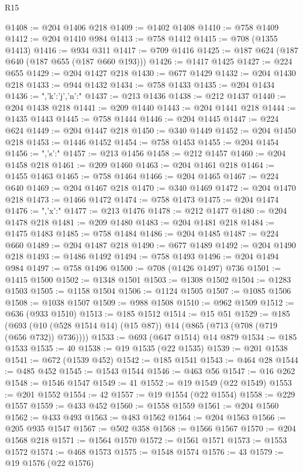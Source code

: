 \begin{lexlean}{R15}
\begin{coremodule}
{{{{{{@1408 := @204 @1406 @218
@1409 := @1402 @1408
@1410 := @758 @1409
@1412 := @204 @1410 @984
@1413 := @758 @1412
@1415 := @708 (@1355 @1413)
@1416 := @934 @311
@1417 := @709 @1416
@1425 := @187 @624 (@187 @640 (@187 @655 (@187 @660 @193)))
@1426 := @1417 @1425
@1427 := @224 @655
@1429 := @204 @1427 @218
@1430 := @677 @1429
@1432 := @204 @1430 @218
@1433 := @944 @1432
@1434 := @758 @1433
@1435 := @204 @1434
@1436 := ",'k':'j','n':"
@1437 := @213 @1436
@1438 := @212 @1437
@1440 := @204 @1438 @218
@1441 := @209 @1440
@1443 := @204 @1441 @218
@1444 := @1435 @1443
@1445 := @758 @1444
@1446 := @204 @1445
@1447 := @224 @624
@1449 := @204 @1447 @218
@1450 := @340 @1449
@1452 := @204 @1450 @218
@1453 := @1446 @1452
@1454 := @758 @1453
@1455 := @204 @1454
@1456 := ",'s':"
@1457 := @213 @1456
@1458 := @212 @1457
@1460 := @204 @1458 @218
@1461 := @209 @1460
@1463 := @204 @1461 @218
@1464 := @1455 @1463
@1465 := @758 @1464
@1466 := @204 @1465
@1467 := @224 @640
@1469 := @204 @1467 @218
@1470 := @340 @1469
@1472 := @204 @1470 @218
@1473 := @1466 @1472
@1474 := @758 @1473
@1475 := @204 @1474
@1476 := ",'x':"
@1477 := @213 @1476
@1478 := @212 @1477
@1480 := @204 @1478 @218
@1481 := @209 @1480
@1483 := @204 @1481 @218
@1484 := @1475 @1483
@1485 := @758 @1484
@1486 := @204 @1485
@1487 := @224 @660
@1489 := @204 @1487 @218
@1490 := @677 @1489
@1492 := @204 @1490 @218
@1493 := @1486 @1492
@1494 := @758 @1493
@1496 := @204 @1494 @984
@1497 := @758 @1496
@1500 := @708 (@1426 @1497) @736
@1501 := @1415 @1500
@1502 := @1348 @1501
@1503 := @1308 @1502
@1504 := @1283 @1503
@1505 := @1158 @1504
@1506 := @1124 @1505
@1507 := @1085 @1506
@1508 := @1038 @1507
@1509 := @988 @1508
@1510 := @962 @1509
@1512 := @636 (@933 @1510)
@1513 := @185 @1512
@1514 := @15 @51
@1529 := @185
    (@693 (@10 (@528 @1514 @14) (@15 @87)) @14 (@865 (@713 (@708 (@719 (@656 @732)) @736))))
@1533 := @693 (@647 @1514) @14 @879
@1534 := @185 @1533
@1535 := 40
@1538 := @19 @1535 (@22 @1535)
@1539 := @201 @1538
@1541 := @672 (@1539 @452)
@1542 := @185 @1541
@1543 := @464 @28
@1544 := @485 @452
@1545 := @1543 @1544
@1546 := @463 @56
@1547 := @16 @262
@1548 := @1546 @1547
@1549 := 41
@1552 := @19 @1549 (@22 @1549)
@1553 := @201 @1552
@1554 := 42
@1557 := @19 @1554 (@22 @1554)
@1558 := @229 @1557
@1559 := @433 @452
@1560 := @1558 @1559
@1561 := @204 @1560
@1562 := @433 @493
@1563 := @483 @1562
@1564 := @204 @1563
@1566 := @205 @935 @1547
@1567 := @502 @358
@1568 := @1566 @1567
@1570 := @204 @1568 @218
@1571 := @1564 @1570
@1572 := @1561 @1571
@1573 := @1553 @1572
@1574 := @468 @1573
@1575 := @1548 @1574
@1576 := 43
@1579 := @19 @1576 (@22 @1576)
}}}}}}
\end{coremodule}
\end{lexlean}
